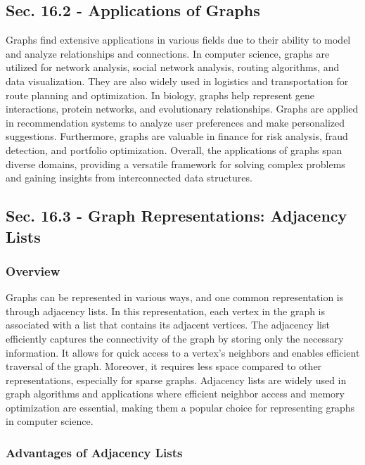 \subsection*{Sec. 16.2 - Applications of Graphs}

Graphs find extensive applications in various fields due to their ability to model and analyze relationships and connections. In computer science, graphs are utilized for network analysis, social network 
analysis, routing algorithms, and data visualization. They are also widely used in logistics and transportation for route planning and optimization. In biology, graphs help represent gene interactions, 
protein networks, and evolutionary relationships. Graphs are applied in recommendation systems to analyze user preferences and make personalized suggestions. Furthermore, graphs are valuable in finance 
for risk analysis, fraud detection, and portfolio optimization. Overall, the applications of graphs span diverse domains, providing a versatile framework for solving complex problems and gaining insights 
from interconnected data structures.

\subsection*{Sec. 16.3 - Graph Representations: Adjacency Lists}

\subsubsection{Overview}

Graphs can be represented in various ways, and one common representation is through adjacency lists. In this representation, each vertex in the graph is associated with a list that contains its adjacent 
vertices. The adjacency list efficiently captures the connectivity of the graph by storing only the necessary information. It allows for quick access to a vertex's neighbors and enables efficient traversal 
of the graph. Moreover, it requires less space compared to other representations, especially for sparse graphs. Adjacency lists are widely used in graph algorithms and applications where efficient neighbor 
access and memory optimization are essential, making them a popular choice for representing graphs in computer science.

\subsubsection{Advantages of Adjacency Lists}

